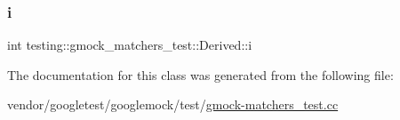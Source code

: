 \subsubsection{\texorpdfstring{i}{i}}
{\footnotesize\ttfamily int testing\+::gmock\+\_\+matchers\+\_\+test\+::\+Derived\+::i}



The documentation for this class was generated from the following file\+:\begin{DoxyCompactItemize}
\item 
vendor/googletest/googlemock/test/\hyperlink{gmock-matchers__test_8cc}{gmock-\/matchers\+\_\+test.\+cc}\end{DoxyCompactItemize}
